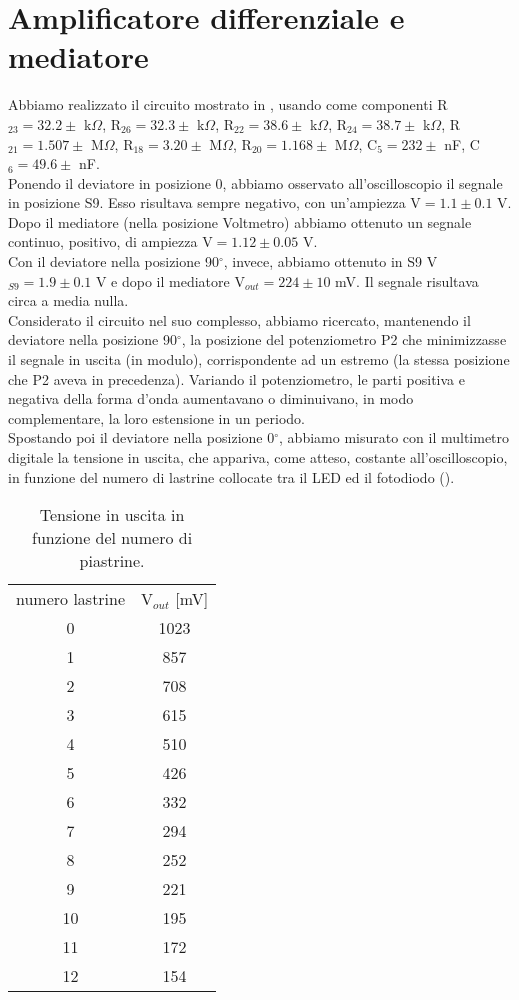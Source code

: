 \section{Amplificatore differenziale e mediatore}
Abbiamo realizzato il circuito mostrato in , usando come componenti R$_{23} = 32.2 \pm $ k$\Omega$, R$_{26} = 32.3 \pm $ k$\Omega$, R$_{22} = 38.6 \pm $ k$\Omega$, R$_{24} = 38.7 \pm $ k$\Omega$, R$_{21} = 1.507 \pm $ M$\Omega$, R$_{18} = 3.20 \pm $ M$\Omega$, R$_{20} = 1.168 \pm $ M$\Omega$,  C$_5 = 232 \pm $ nF, C$_6 = 49.6 \pm $ nF.\\
Ponendo il deviatore in posizione 0, abbiamo osservato all'oscilloscopio il segnale in posizione S9. Esso risultava sempre negativo, con un'ampiezza V$ = 1.1 \pm 0.1$ V. Dopo il mediatore (nella posizione Voltmetro) abbiamo ottenuto un segnale continuo, positivo, di ampiezza V$ = 1.12 \pm 0.05$ V.\\
Con il deviatore nella posizione 90$^\circ$, invece, abbiamo ottenuto in S9 V$_{S9} = 1.9 \pm 0.1$ V e dopo il mediatore V$_{out} = 224 \pm 10$ mV. Il segnale risultava circa a media nulla.\\
Considerato il circuito nel suo complesso, abbiamo ricercato, mantenendo il deviatore nella posizione 90$^\circ$, la posizione del potenziometro P2 che minimizzasse il segnale in uscita (in modulo), corrispondente ad un estremo (la stessa posizione che P2 aveva in precedenza). Variando il potenziometro, le parti positiva e negativa della forma d'onda aumentavano o diminuivano, in modo complementare, la loro estensione in un periodo.\\ Spostando poi il deviatore nella posizione 0$^\circ$, abbiamo misurato con il multimetro digitale la tensione in uscita, che appariva, come atteso, costante all'oscilloscopio, in funzione del numero di lastrine collocate tra il LED ed il fotodiodo ().\\
\begin{table}[h]
	\centering
	\begin{tabular}{cc}		
		{numero lastrine} & {V$_{out}$ [mV]}\\
                      0 & 1023\\
                      1 & 857\\
                      2 & 708\\
                      3 & 615\\
                      4 & 510\\
                      5 & 426\\
                      6 & 332\\
                      7 & 294\\
                      8 & 252\\
                      9 & 221\\
                     10 & 195\\
                     11 & 172\\
                     12 & 154\\
	           \midrule
	
 	\end{tabular}
	\caption{Tensione in uscita in funzione del numero di piastrine. }
	\label{t:Fotodiodo}
\end{table}
